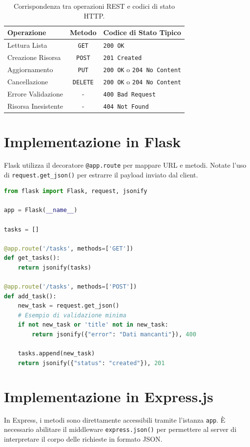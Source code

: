 \documentclass[11pt,a4paper]{report}
\begin{document}
\begin{table}[ht]
\centering
\begin{tabular}{lcl}
\toprule
\textbf{Operazione} & \textbf{Metodo} & \textbf{Codice di Stato Tipico} \\
\midrule
Lettura Lista       & \texttt{GET}    & \texttt{200 OK} \\
Creazione Risorsa   & \texttt{POST}   & \texttt{201 Created} \\
Aggiornamento       & \texttt{PUT}    & \texttt{200 OK} o \texttt{204 No Content} \\
Cancellazione       & \texttt{DELETE} & \texttt{200 OK} o \texttt{204 No Content} \\
Errore Validazione  & -               & \texttt{400 Bad Request} \\
Risorsa Inesistente & -               & \texttt{404 Not Found} \\
\bottomrule
\end{tabular}
\caption{Corrispondenza tra operazioni REST e codici di stato HTTP.}
\label{tab:rest_status_codes}
\end{table}

\section{Implementazione in Flask}
Flask utilizza il decoratore \texttt{@app.route} per mappare URL e metodi. Notate l'uso di \texttt{request.get\_json()} per estrarre il payload inviato dal client.

\begin{lstlisting}[language=python, caption=Implementazione REST in Flask]
from flask import Flask, request, jsonify

app = Flask(__name__)

tasks = []

@app.route('/tasks', methods=['GET'])
def get_tasks():
    return jsonify(tasks)

@app.route('/tasks', methods=['POST'])
def add_task():
    new_task = request.get_json()
    # Esempio di validazione minima
    if not new_task or 'title' not in new_task:
        return jsonify({"error": "Dati mancanti"}), 400
    
    tasks.append(new_task)
    return jsonify({"status": "created"}), 201
\end{lstlisting}

\section{Implementazione in Express.js}
In Express, i metodi sono direttamente accessibili tramite l'istanza \texttt{app}. \`E necessario abilitare il middleware \texttt{express.json()} per permettere al server di interpretare il corpo delle richieste in formato JSON.
\end{document}
